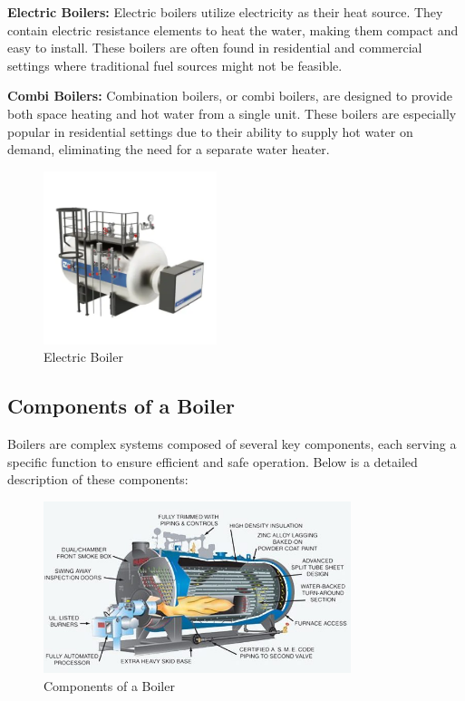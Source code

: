 \textbf{Electric Boilers:}
Electric boilers utilize electricity as their heat source. They contain electric resistance elements to heat the water, making them compact and easy to install. These boilers are often found in residential and commercial settings where traditional fuel sources might not be feasible.

\textbf{Combi Boilers: }
Combination boilers, or combi boilers, are designed to provide both space heating and hot water from a single unit. These boilers are especially popular in residential settings due to their ability to supply hot water on demand, eliminating the need for a separate water heater.

\begin{figure}[h]
\centering
\includegraphics[width=0.45\textwidth]{figs/lastmin/electric_steam_boiler.png}
\caption{Electric Boiler}
\label{fig:Electric Boiler}
\end{figure}

\subsection{Components of a Boiler}
Boilers are complex systems composed of several key components, each serving a specific function to ensure efficient and safe operation. Below is a detailed description of these components:

\begin{figure}[h]
\centering
\includegraphics[width=0.8\textwidth]{figs/lastmin/boiler_components.png}
\caption{Components of a Boiler}
\label{fig:boiler_components}
\end{figure}

